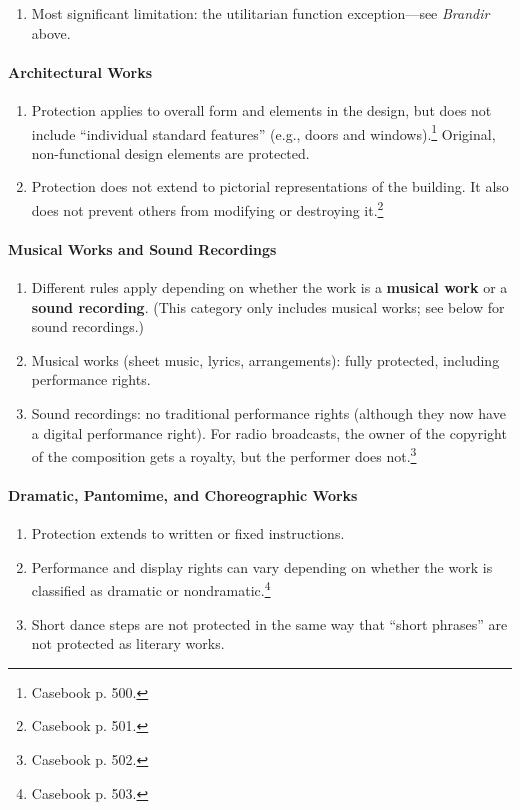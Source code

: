 \begin{enumerate}
    \item Most significant limitation: the utilitarian function 
    exception---see \emph{Brandir} above.
\end{enumerate}

\paragraph{Architectural Works}

\begin{enumerate}
    \item Protection applies to overall form and elements in the design, but 
    does not include ``individual standard features'' (e.g., doors and 
    windows).\footnote{Casebook p.  500.} Original, non-functional design 
    elements are protected.
    \item Protection does not extend to pictorial representations of the 
    building. It also does not prevent others from modifying or destroying 
    it.\footnote{Casebook p. 501.}
\end{enumerate}

\paragraph{Musical Works and Sound Recordings}

\begin{enumerate}
    \item Different rules apply depending on whether the work is a 
    \textbf{musical work} or a \textbf{sound recording}. (This category only 
    includes musical works; see below for sound recordings.)
    \item Musical works (sheet music, lyrics, arrangements): fully protected, 
    including performance rights.
    \item Sound recordings: no traditional performance rights (although they 
    now have a digital performance right). For radio broadcasts, the owner of 
    the copyright of the composition gets a royalty, but the performer does 
    not.\footnote{Casebook p. 502.}
\end{enumerate}

\paragraph{Dramatic, Pantomime, and Choreographic Works}

\begin{enumerate}
    \item Protection extends to written or fixed instructions. 
    \item Performance and display rights can vary depending on whether the 
    work is classified as dramatic or nondramatic.\footnote{Casebook p. 503.}
    \item Short dance steps are not protected in the same way that ``short 
    phrases'' are not protected as literary works.
\end{enumerate}

